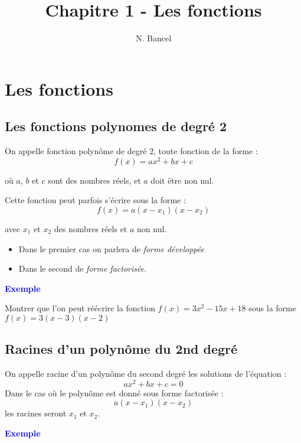 \documentclass[a4paper,12pt]{article}
\begin{document}
\title{Chapitre 1 - Les fonctions}
\author{N. Bancel}

\maketitle

\def\WITH_CORRECTION{NO}

\section*{Les fonctions}



\subsection*{Les fonctions polynomes de degré 2}

On appelle fonction polynôme de degré 2, toute fonction de la forme :
\[
    f(x) = ax^2 + bx + c
\]


où $a$, $b$ et $c$ sont des nombres réels, et $a$ doit être non nul.

Cette fonction peut parfois s'écrire sous la forme : 
\[
    f(x) = a(x - x_1)(x - x_2)
\]

avec $x_1$ et $x_2$ des nombres réels et $a$ non nul.

\begin{itemize}[noitemsep]
  \item Dans le premier cas on parlera de \textit{forme développée}
  \item Dans le second de \textit{forme factorisée}.
\end{itemize}


\textbf{\textcolor{blue}{Exemple}} \par 

Montrer que l'on peut réécrire la fonction $f(x) = 3x^2 - 15x + 18$ sous la forme $f(x) = 3(x - 3)(x - 2)$

\subsection*{Racines d'un polynôme du 2nd degré}

On appelle racine d'un polynôme du second degré les solutions de l'équation :
\[
    ax^2 + bx + c = 0
\]
Dans le cas où le polynôme est donné sous forme factorisée :
\[
    a(x - x_1)(x - x_2)
\]
les racines seront $x_1$ et $x_2$.


\textbf{\textcolor{blue}{Exemple}} \par
\end{document}
